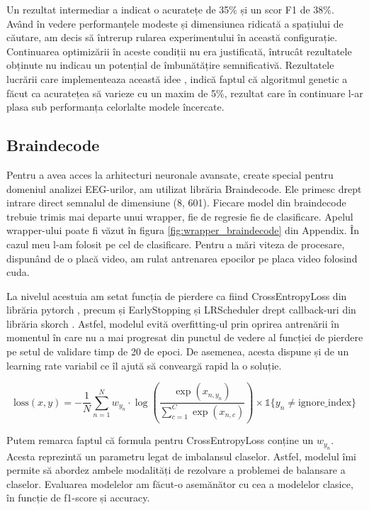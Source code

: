 Un rezultat intermediar a indicat o acuratețe de 35\% și un scor F1 de 38\%. Având în vedere performanțele modeste și dimensiunea ridicată a spațiului de căutare, am decis să întrerup rularea experimentului în această configurație. Continuarea optimizării în aceste condiții nu era justificată, întrucât rezultatele obținute nu indicau un potențial de îmbunătățire semnificativă. Rezultatele lucrării care implementeaza această idee \cite{ATKINSON201635}, indică faptul că algoritmul genetic a făcut ca acuratețea să varieze cu un maxim de 5\%, rezultat care în continuare l-ar plasa sub performanța celorlalte modele încercate. 

\subsection{Braindecode}
Pentru a avea acces la arhitecturi neuronale avansate, create special pentru domeniul analizei EEG-urilor, am utilizat librăria Braindecode\cite{braindecode}. Ele primesc drept intrare direct semnalul de dimensiune (8, 601). Fiecare model din braindecode trebuie trimis mai departe unui wrapper, fie de regresie fie de clasificare. Apelul wrapper-ului poate fi văzut în figura \ref{fig:wrapper_braindecode} din Appendix. În cazul meu l-am folosit pe cel de clasificare. Pentru a mări viteza de procesare, dispunând de o placă video, am rulat antrenarea epocilor pe placa video folosind cuda.

La nivelul acestuia am setat funcția de pierdere ca fiind CrossEntropyLoss din librăria pytorch \cite{pytorch}, precum și EarlyStopping și LRScheduler drept callback-uri din librăria skorch \cite{skorch}. Astfel, modelul evită overfitting-ul prin oprirea antrenării în momentul în care nu a mai progresat din punctul de vedere al funcției de pierdere pe setul de validare timp de 20 de epoci. De asemenea, acesta dispune și de un learning rate variabil ce îl ajută să conveargă rapid la o soluție. 

\begin{equation}
    \text{loss}(x, y) = -\frac{1}{N} \sum_{n=1}^{N} w_{y_n} \cdot \log\left(\frac{\exp(x_{n,y_n})}{\sum_{c=1}^{C} \exp(x_{n,c})}\right) \times \mathbb{1}\{y_n \neq \text{ignore\_index}\}
\end{equation}

Putem remarca faptul că formula pentru CrossEntropyLoss conține un \(w_{y_n}\). Acesta reprezintă un parametru legat de imbalansul claselor. Astfel, modelul îmi permite să abordez ambele modalități de rezolvare a problemei de balansare a claselor. Evaluarea modelelor am făcut-o asemănător cu cea a modelelor clasice, în funcție de f1-score și accuracy.

